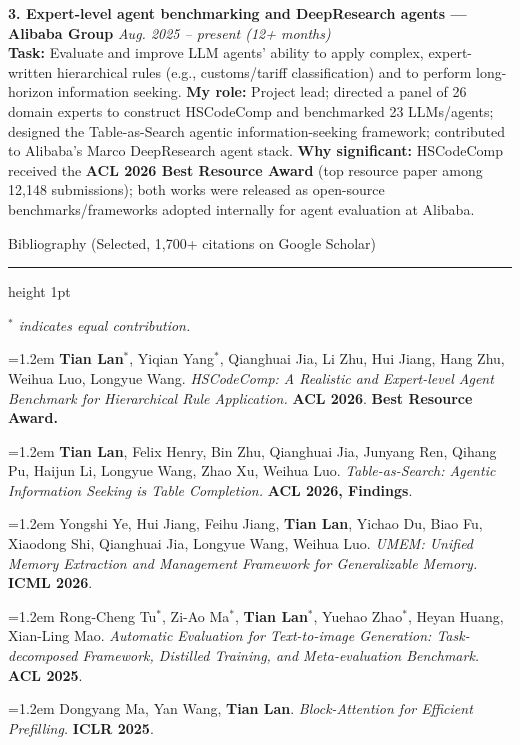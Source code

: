 \documentclass[10.5pt]{article}
\newcommand{\cvsection}[1]{%
  \vspace{10pt}
  {\color{accent}\headingfont\Large #1}\par
  \vspace{2pt}
  {\color{accent}\hrule height 1pt}
  \vspace{6pt}
}
\newcommand{\pubitem}[1]{\par\noindent\hangindent=1.2em\hangafter=1 #1\par\vspace{4pt}}
\newcommand{\venue}[1]{\textbf{\color{accent}#1}}
\begin{document}
\vspace{6pt}
\textbf{3. Expert-level agent benchmarking and DeepResearch agents --- Alibaba Group} \hfill \textit{Aug. 2025 -- present (12+ months)}\\
\textbf{Task:} Evaluate and improve LLM agents' ability to apply complex, expert-written hierarchical rules (e.g., customs/tariff classification) and to perform long-horizon information seeking.
\textbf{My role:} Project lead; directed a panel of 26 domain experts to construct HSCodeComp and benchmarked 23 LLMs/agents; designed the Table-as-Search agentic information-seeking framework; contributed to Alibaba's Marco DeepResearch agent stack.
\textbf{Why significant:} HSCodeComp received the \textbf{ACL 2026 Best Resource Award} (top resource paper among 12{,}148 submissions); both works were released as open-source benchmarks/frameworks adopted internally for agent evaluation at Alibaba.

\cvsection{Bibliography (Selected, 1{,}700+ citations on Google Scholar)}
{\small \textit{$^{*}$ indicates equal contribution.}}\par\vspace{4pt}

\pubitem{\textbf{Tian Lan}$^{*}$, Yiqian Yang$^{*}$, Qianghuai Jia, Li Zhu, Hui Jiang, Hang Zhu, Weihua Luo, Longyue Wang. \textit{HSCodeComp: A Realistic and Expert-level Agent Benchmark for Hierarchical Rule Application.} \venue{ACL 2026}. \textbf{Best Resource Award.}}

\pubitem{\textbf{Tian Lan}, Felix Henry, Bin Zhu, Qianghuai Jia, Junyang Ren, Qihang Pu, Haijun Li, Longyue Wang, Zhao Xu, Weihua Luo. \textit{Table-as-Search: Agentic Information Seeking is Table Completion.} \venue{ACL 2026, Findings}.}

\pubitem{Yongshi Ye, Hui Jiang, Feihu Jiang, \textbf{Tian Lan}, Yichao Du, Biao Fu, Xiaodong Shi, Qianghuai Jia, Longyue Wang, Weihua Luo. \textit{UMEM: Unified Memory Extraction and Management Framework for Generalizable Memory.} \venue{ICML 2026}.}

\pubitem{Rong-Cheng Tu$^{*}$, Zi-Ao Ma$^{*}$, \textbf{Tian Lan}$^{*}$, Yuehao Zhao$^{*}$, Heyan Huang, Xian-Ling Mao. \textit{Automatic Evaluation for Text-to-image Generation: Task-decomposed Framework, Distilled Training, and Meta-evaluation Benchmark.} \venue{ACL 2025}.}

\pubitem{Dongyang Ma, Yan Wang, \textbf{Tian Lan}. \textit{Block-Attention for Efficient Prefilling.} \venue{ICLR 2025}.}
\end{document}
